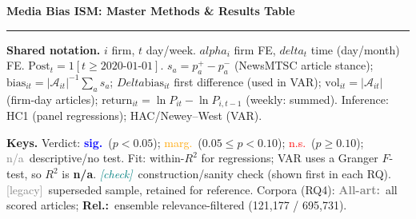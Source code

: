 \documentclass[10pt]{article}
\def\alpha{alpha}%
\def\delta{delta}%
\def\Delta{Delta}%
\def\mathbb#1{#1}%
\newcommand{\sig}{\textcolor{blue}{\textbf{sig.}}}
\newcommand{\ns}{\textcolor{red}{n.s.}}
\newcommand{\marg}{\textcolor{orange}{marg.}}
\newcommand{\na}{\textcolor{gray}{n/a}}
\newcommand{\allart}{\textcolor{gray}{\textbf{All-art:}}}
\newcommand{\rel}{\textbf{Rel.:}}
\newcommand{\chk}{\textcolor{teal}{\textit{\small[check]}}}
\newcommand{\legacy}{\textcolor{gray}{\small[legacy]}}
\begin{document}
\begin{center}
{\LARGE \textbf{Media Bias ISM: Master Methods \& Results Table}}
\end{center}
\vspace{0.2em}
\hrule
\vspace{0.6em}
\footnotesize

\noindent\textbf{Shared notation.}
$i$ firm, $t$ day/week. $\alpha_i$ firm FE, $\delta_t$ time (day/month) FE.
$\text{Post}_t=\mathbb{1}[t\ge\text{2020-01-01}]$.
$s_a=p_a^{+}-p_a^{-}$ (NewsMTSC article stance); $\text{bias}_{it}=|\mathcal{A}_{it}|^{-1}\sum_{a}s_a$;
$\Delta\text{bias}_{it}$ first difference (used in VAR); $\text{vol}_{it}=|\mathcal{A}_{it}|$ (firm-day articles);
$\text{return}_{it}=\ln P_{it}-\ln P_{i,t-1}$ (weekly: summed).
Inference: HC1 (panel regressions); HAC/Newey--West (VAR). \quad

\noindent\textbf{Keys.}
Verdict: \sig\ ($p<0.05$); \marg\ ($0.05\le p<0.10$); \ns\ ($p\ge0.10$); \na\ descriptive/no test.
\quad Fit: within-$R^2$ for regressions; VAR uses a Granger $F$-test, so $R^2$ is \textbf{n/a}.
\quad \chk\ construction/sanity check (shown first in each RQ). \quad \legacy\ superseded sample, retained for reference.
\quad Corpora (RQ4): \allart\ all scored articles; \rel\ ensemble relevance-filtered (121{,}177 / 695{,}731).

\vspace{0.4em}
\end{document}
